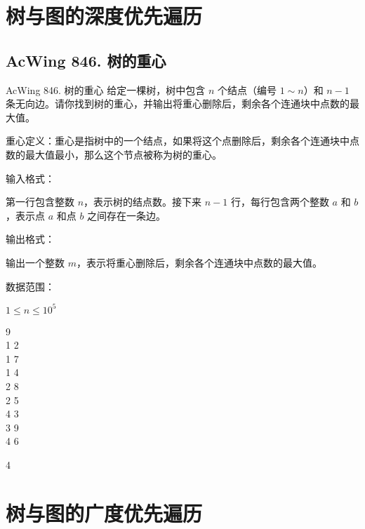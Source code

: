 \section{树与图的深度优先遍历}
\subsection{AcWing 846. 树的重心}
\begin{titledbox}{AcWing 846. 树的重心}
给定一棵树，树中包含 $n$ 个结点（编号 $1 \sim n$）和 $n-1$ 条无向边。请你找到树的重心，并输出将重心删除后，剩余各个连通块中点数的最大值。

重心定义：重心是指树中的一个结点，如果将这个点删除后，剩余各个连通块中点数的最大值最小，那么这个节点被称为树的重心。

输入格式：

第一行包含整数 $n$，表示树的结点数。接下来 $n-1$ 行，每行包含两个整数 $a$ 和 $b$，表示点 $a$ 和点 $b$ 之间存在一条边。

输出格式：

输出一个整数 $m$，表示将重心删除后，剩余各个连通块中点数的最大值。

数据范围：

$1 \le n \le 10^5$

\begin{inputblock}
    9 \\
    1 2 \\
    1 7 \\
    1 4 \\
    2 8 \\
    2 5 \\
    4 3 \\
    3 9 \\
    4 6
\end{inputblock}
\begin{outputblock}
    4
\end{outputblock}
\end{titledbox}


\section{树与图的广度优先遍历}
